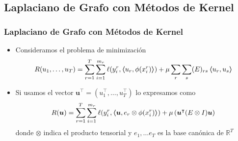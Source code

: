 \documentclass[aspectratio=43]{beamer}
\newcommand{\myvec}[1]{\bm{#1}}
\newcommand{\fv}[1]{\myvec{#1}}
\newcommand{\dotp}[2]{\bm{\left\langle} #1, #2 \bm{\right\rangle}}
\newcommand{\ntasks}{T}
\newcommand{\npertask}{m}
\newcommand{\reals}{\mathbb{R}}
\newcommand{\lossf}{\ell}
\begin{document}
\subsection{Laplaciano de Grafo con Métodos de Kernel}

\begin{frame}
      \frametitle{Laplaciano de Grafo con Métodos de Kernel}

      \begin{itemize}
            \item Consideramos el problema de minimización
            \begin{equation}
                  \label{eq:mtl_kernel_altext_original}
                  \begin{aligned}
                       & R({u_1, \ldots, u_T}) = \sum_{r=1}^{\ntasks} \sum_{i=1}^{\npertask_r} \lossf(y_i^r, \dotp{u_r}{\phi(x_i^r)}) + \mu \sum_r \sum_s (E)_{rs} \dotp{u_r}{u_s}  \\
                  \end{aligned}
            \end{equation}
            \item Si usamos el vector $\fv{u}^\intercal = (u_1^\intercal, \ldots, u_\ntasks^\intercal)$ lo expresamos como
            \begin{equation}
                  \label{eq:mtl_kernel_altext_tensor}
                  \begin{aligned}
                          & R(\myvec{u}) = \sum_{r=1}^{\ntasks} \sum_{i=1}^{\npertask_r} \lossf(y_i^r, \dotp{\myvec{u}}{e_r \otimes \phi(x_i^r)}) + \mu \left(  \myvec{u}^\intercal (E \otimes I) \myvec{u} \right) \\
                  \end{aligned}
              \end{equation}
              donde $\otimes$ indica el producto tensorial y $e_1, \ldots e_\ntasks$ es la base canónica de $\reals^\ntasks$
      \end{itemize}

\end{frame}
\end{document}
